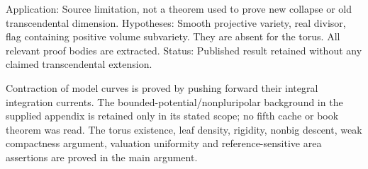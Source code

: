 \documentclass[11pt]{article}
\begin{document}
Application: Source limitation, not a theorem used to prove new collapse or old transcendental dimension. Hypotheses: Smooth projective variety, real divisor, flag containing positive volume subvariety. They are absent for the torus. All relevant proof bodies are extracted. Status: Published result retained without any claimed transcendental extension.

Contraction of model curves is proved by pushing forward their integral integration currents. The bounded-\allowbreak{}potential/\allowbreak{}nonpluripolar background in the supplied appendix is retained only in its stated scope; no fifth cache or book theorem was read. The torus existence, leaf density, rigidity, nonbig descent, weak compactness argument, valuation uniformity and reference-\allowbreak{}sensitive area assertions are proved in the main argument.
\end{document}
